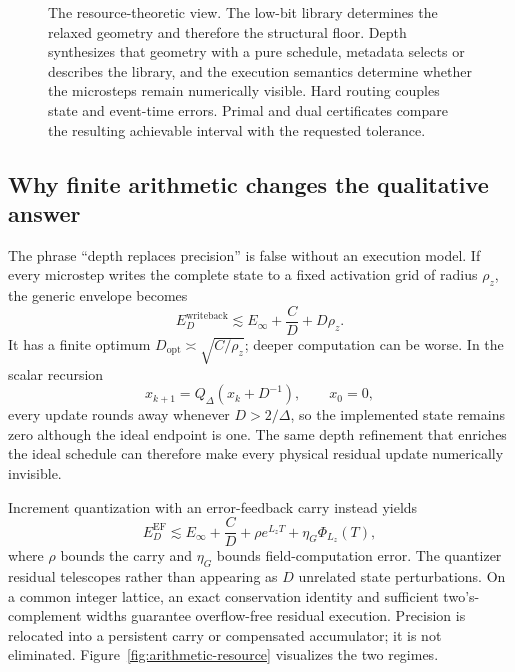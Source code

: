 \documentclass[twoside,11pt]{article}
\begin{document}
\begin{figure}[t]
{\begin{tikzpicture}[
    >=Latex,
    font=\small,
    node distance=9mm and 10mm
]
\end{tikzpicture}}
\caption{\textnormal{The resource-theoretic view.}  The low-bit library
determines the relaxed geometry and therefore the structural floor.  Depth
synthesizes that geometry with a pure schedule, metadata selects or describes
the library, and the execution semantics determine whether the microsteps
remain numerically visible.  Hard routing couples state and event-time errors.
Primal and dual certificates compare the resulting achievable interval with
the requested tolerance.}
\label{fig:resource-overview}
\end{figure}

\subsection{Why finite arithmetic changes the qualitative answer}
\label{sec:arithmetic-preview}

The phrase ``depth replaces precision'' is false without an execution model.
If every microstep writes the complete state to a fixed activation grid of
radius $\rho_z$, the generic envelope becomes
\begin{equation}
 E_D^{\mathrm{writeback}}
 \lesssim E_\infty+\frac{C}{D}+D\rho_z.
 \label{eq:writeback-preview}
\end{equation}
It has a finite optimum $D_{\mathrm{opt}}\asymp\sqrt{C/\rho_z}$; deeper
computation can be worse.  In the scalar recursion
\[
 x_{k+1}=Q_\Delta(x_k+D^{-1}),\qquad x_0=0,
\]
every update rounds away whenever $D>2/\Delta$, so the implemented state
remains zero although the ideal endpoint is one.  The same depth refinement
that enriches the ideal schedule can therefore make every physical residual
update numerically invisible.

Increment quantization with an error-feedback carry instead yields
\begin{equation}
 E_D^{\mathrm{EF}}
 \lesssim E_\infty+\frac{C}{D}+\rho e^{L_zT}+\eta_G\Phi_{L_z}(T),
 \label{eq:error-feedback-preview}
\end{equation}
where $\rho$ bounds the carry and $\eta_G$ bounds field-computation error.  The
quantizer residual telescopes rather than appearing as $D$ unrelated state
perturbations.  On a common integer lattice, an exact conservation identity
and sufficient two's-complement widths guarantee overflow-free residual
execution.  Precision is relocated into a persistent carry or compensated
accumulator; it is not eliminated.  Figure~\ref{fig:arithmetic-resource}
visualizes the two regimes.
\end{document}
